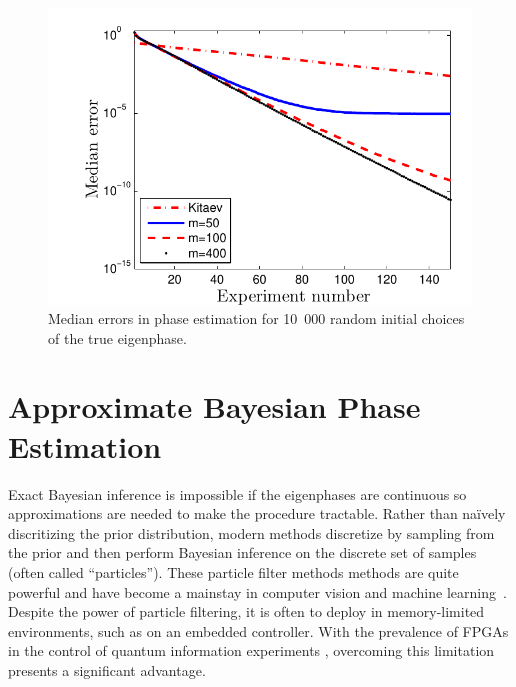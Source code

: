 \documentclass[aps,pra,amsmath,twocolumn,amssymb,superscriptaddress]{revtex4-1}
\begin{document}
\begin{figure}[t!]
    \begin{centering}
        \includegraphics[width=0.8\linewidth]{PEerror.pdf}
    \end{centering}
    \caption{\label{fig:PEerror}
     Median errors in phase estimation for 10~000 random initial choices of the true eigenphase.
    }
\end{figure}




\section{Approximate Bayesian Phase Estimation}

Exact Bayesian inference is impossible if the eigenphases are
continuous so approximations are needed to
make the procedure tractable.  Rather than na\"ively discritizing the prior
distribution, modern methods discretize by sampling from the prior and
then perform Bayesian inference on the discrete set of samples (often called
``particles'').  These particle filter methods methods are quite powerful and
have become a mainstay in computer vision and machine
learning~\cite{haykin2004kalman,smith2013sequential,isard_condensationconditional_1998}.
Despite the power of particle filtering, it is often to deploy in memory-limited environments,
such as on an embedded controller. With the prevalence of FPGAs in the control of
quantum information experiments
\cite{shulman_suppressing_2014,casagrande_design_2014,hornibrook_cryogenic_2015},
overcoming this limitation presents a significant advantage.
\end{document}
